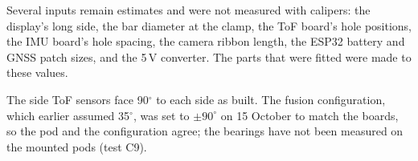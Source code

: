 Several inputs remain estimates and were not measured with calipers: the display's long side, the bar diameter at the clamp, the ToF board's hole positions, the IMU board's hole spacing, the camera ribbon length, the ESP32 battery and GNSS patch sizes, and the 5\,V converter. The parts that were fitted were made to these values.

The side ToF sensors face 90$^\circ$ to each side as built. The fusion configuration, which earlier assumed 35$^\circ$, was set to $\pm 90^\circ$ on 15 October to match the boards, so the pod and the configuration agree; the bearings have not been measured on the mounted pods (test C9).
